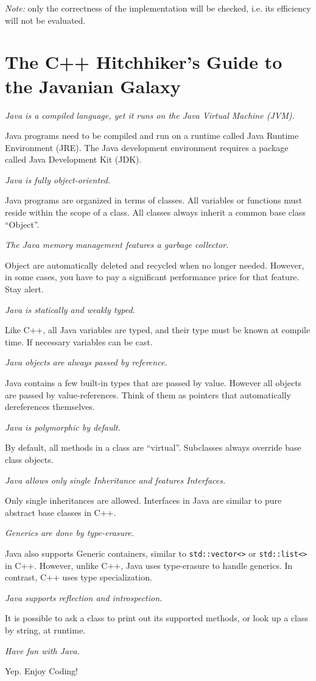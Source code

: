 \documentclass[11pt,a4paper]{article}
\begin{document}
{\em Note:} only the correctness of the implementation will be checked, i.e. its efficiency will not be evaluated.

\appendix 
\section{The C++ Hitchhiker's Guide to the Javanian Galaxy}
\label{cpp2java}

	{\em Java is a compiled language, yet it runs on the Java Virtual Machine (JVM).}

		Java programs need to be compiled and run on a runtime called Java Runtime Environment (JRE). The Java development environment requires a package called Java Development Kit (JDK).\medskip

	{\em Java is fully object-oriented.}

Java programs are organized in terms of classes. All variables
or functions must reside within the scope of a class. All classes
always inherit a common base class ``Object''.\medskip

{\em  The Java memory management features a garbage collector.}

Object are automatically deleted and recycled when no longer needed.
 However, in some cases,
you have to pay a significant performance price for that feature.
Stay alert.\medskip

{\em Java is statically and weakly typed.}

Like C++, all Java variables are typed, and their type must be
known at compile time. If necessary variables can be cast.\medskip

{\em  Java objects are always passed by reference.}

Java contains a few built-in types that are passed by value. However
all objects are passed by value-references. Think of them as pointers
that automatically dereferences themselves.\medskip

{\em Java is polymorphic by default.}

By default, all methods in a class are ``virtual''. Subclasses always
override base class objects.\medskip

{\em Java allows only single Inheritance and features Interfaces.}

Only single inheritances are allowed. Interfaces in Java are similar
to pure abstract base classes in C++.\medskip

{\em Generics are done by type-erasure.}

Java also supports Generic containers, similar to {\tt std::vector<>} or
{\tt std::list<>} in C++. However, unlike C++, Java uses type-erasure to
handle generics. In contrast, C++ uses type specialization.\medskip

{\em Java supports reflection and introspection.}

It is possible to ask a class to print out its supported methods,
or look up a class by string, at runtime.\medskip

{\em Have fun with Java.}

Yep. Enjoy Coding!
\end{document}
